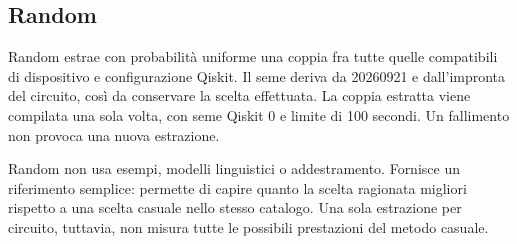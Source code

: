 
\subsection{Random}
Random estrae con probabilità uniforme una coppia fra tutte quelle compatibili
di dispositivo e configurazione Qiskit. Il seme deriva da 20260921 e
dall'impronta del circuito, così da conservare la scelta effettuata.
La coppia estratta viene compilata una sola volta, con seme Qiskit 0
e limite di 100 secondi. Un fallimento non provoca una nuova estrazione.

Random non usa esempi, modelli linguistici o addestramento.
Fornisce un riferimento semplice: permette di capire quanto la scelta
ragionata migliori rispetto a una scelta casuale nello stesso catalogo.
Una sola estrazione per circuito, tuttavia, non misura tutte le possibili
prestazioni del metodo casuale.

